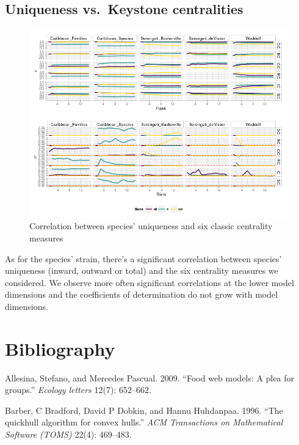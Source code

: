 \documentclass[11pt,article,oneside]{memoir}
\makeatletter
\def\maxwidth{\ifdim\Gin@nat@width>\linewidth\linewidth
\else\Gin@nat@width\fi}
\let\Oldincludegraphics\includegraphics
\renewcommand{\includegraphics}[1]{\Oldincludegraphics[width=\maxwidth]{#1}}
\makeatother
\begin{document}
\subsection{Uniqueness vs.~Keystone
centralities}\label{uniqueness-vs.keystone-centralities}

\begin{figure}[htbp]
\centering
\includegraphics{Images/MeanD_Keystones.png}
\caption{Correlation between species' uniqueness and six classic
centrality measures}
\end{figure}

As for the species' strain, there's a significant correlation between
species' uniqueness (inward, outward or total) and the six centrality
measures we considered. We observe more often significant correlations
at the lower model dimensions and the coefficients of determination do
not grow with model dimensions.

\newpage

\section*{Bibliography}\label{bibliography}

Allesina, Stefano, and Mercedes Pascual. 2009. ``Food web models: A plea
for groups.'' \emph{Ecology letters} 12(7): 652--662.

Barber, C Bradford, David P Dobkin, and Hannu Huhdanpaa. 1996. ``The
quickhull algorithm for convex hulls.'' \emph{ACM Transactions on
Mathematical Software (TOMS)} 22(4): 469--483.
\end{document}
